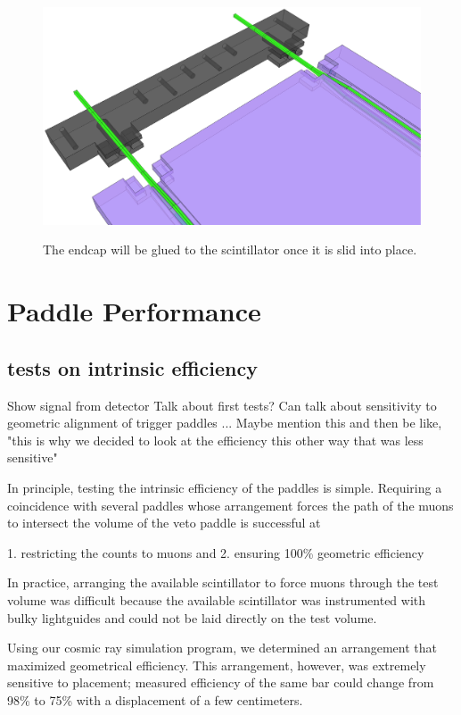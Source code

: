\begin{figure}[ht]
\centering
\includegraphics[width=1.0\textwidth]{figures/veto_assembly.eps}
\label{fig:paddleAssembly}
\caption{The endcap will be glued to the scintillator once it is slid into place.}
\end{figure}

\section{Paddle Performance}
\subsection{tests on intrinsic efficiency}
Show signal from detector
Talk about first tests?  Can talk about sensitivity to geometric alignment of trigger paddles ...
Maybe mention this and then be like, "this is why we decided to look at the efficiency this other way that was less sensitive"

In principle, testing the intrinsic efficiency of the paddles is simple.  Requiring a coincidence with several paddles whose arrangement forces the path of the muons to intersect the volume of the veto paddle is successful at 

1. restricting the counts to muons and
2. ensuring 100\% geometric efficiency

In practice, arranging the available scintillator to force muons through the test volume was difficult because the available scintillator was instrumented with bulky lightguides and could not be laid directly on the test volume.

Using our cosmic ray simulation program, we determined an arrangement that maximized geometrical efficiency.  This arrangement, however, was extremely sensitive to placement; measured efficiency of the same bar could change from 98\% to 75\% with a displacement of a few centimeters.

